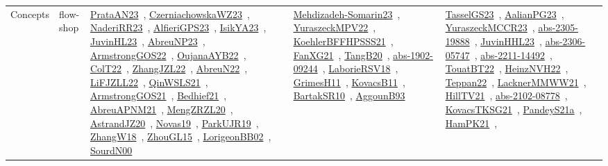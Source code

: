 {\begin{longtable}{lp{3cm}>{\raggedright\arraybackslash}p{6cm}>{\raggedright\arraybackslash}p{6cm}>{\raggedright\arraybackslash}p{8cm}}
Concepts & flow-shop & \href{works/PrataAN23.pdf}{PrataAN23}~\cite{PrataAN23}, \href{works/CzerniachowskaWZ23.pdf}{CzerniachowskaWZ23}~\cite{CzerniachowskaWZ23}, \href{works/NaderiRR23.pdf}{NaderiRR23}~\cite{NaderiRR23}, \href{works/AlfieriGPS23.pdf}{AlfieriGPS23}~\cite{AlfieriGPS23}, \href{works/IsikYA23.pdf}{IsikYA23}~\cite{IsikYA23}, \href{works/JuvinHL23.pdf}{JuvinHL23}~\cite{JuvinHL23}, \href{works/AbreuNP23.pdf}{AbreuNP23}~\cite{AbreuNP23}, \href{works/ArmstrongGOS22.pdf}{ArmstrongGOS22}~\cite{ArmstrongGOS22}, \href{works/OujanaAYB22.pdf}{OujanaAYB22}~\cite{OujanaAYB22}, \href{works/ColT22.pdf}{ColT22}~\cite{ColT22}, \href{works/ZhangJZL22.pdf}{ZhangJZL22}~\cite{ZhangJZL22}, \href{works/AbreuN22.pdf}{AbreuN22}~\cite{AbreuN22}, \href{works/LiFJZLL22.pdf}{LiFJZLL22}~\cite{LiFJZLL22}, \href{works/QinWSLS21.pdf}{QinWSLS21}~\cite{QinWSLS21}, \href{works/ArmstrongGOS21.pdf}{ArmstrongGOS21}~\cite{ArmstrongGOS21}, \href{works/Bedhief21.pdf}{Bedhief21}~\cite{Bedhief21}, \href{works/AbreuAPNM21.pdf}{AbreuAPNM21}~\cite{AbreuAPNM21}, \href{works/MengZRZL20.pdf}{MengZRZL20}~\cite{MengZRZL20}, \href{works/AstrandJZ20.pdf}{AstrandJZ20}~\cite{AstrandJZ20}, \href{works/Novas19.pdf}{Novas19}~\cite{Novas19}, \href{works/ParkUJR19.pdf}{ParkUJR19}~\cite{ParkUJR19}, \href{works/ZhangW18.pdf}{ZhangW18}~\cite{ZhangW18}, \href{works/ZhouGL15.pdf}{ZhouGL15}~\cite{ZhouGL15}, \href{works/LorigeonBB02.pdf}{LorigeonBB02}~\cite{LorigeonBB02}, \href{works/SourdN00.pdf}{SourdN00}~\cite{SourdN00} & \href{works/Mehdizadeh-Somarin23.pdf}{Mehdizadeh-Somarin23}~\cite{Mehdizadeh-Somarin23}, \href{works/YuraszeckMPV22.pdf}{YuraszeckMPV22}~\cite{YuraszeckMPV22}, \href{works/KoehlerBFFHPSSS21.pdf}{KoehlerBFFHPSSS21}~\cite{KoehlerBFFHPSSS21}, \href{works/FanXG21.pdf}{FanXG21}~\cite{FanXG21}, \href{works/TangB20.pdf}{TangB20}~\cite{TangB20}, \href{works/abs-1902-09244.pdf}{abs-1902-09244}~\cite{abs-1902-09244}, \href{works/LaborieRSV18.pdf}{LaborieRSV18}~\cite{LaborieRSV18}, \href{works/GrimesH11.pdf}{GrimesH11}~\cite{GrimesH11}, \href{works/KovacsB11.pdf}{KovacsB11}~\cite{KovacsB11}, \href{works/BartakSR10.pdf}{BartakSR10}~\cite{BartakSR10}, \href{works/AggounB93.pdf}{AggounB93}~\cite{AggounB93} & \href{works/TasselGS23.pdf}{TasselGS23}~\cite{TasselGS23}, \href{works/AalianPG23.pdf}{AalianPG23}~\cite{AalianPG23}, \href{works/YuraszeckMCCR23.pdf}{YuraszeckMCCR23}~\cite{YuraszeckMCCR23}, \href{works/abs-2305-19888.pdf}{abs-2305-19888}~\cite{abs-2305-19888}, \href{works/JuvinHHL23.pdf}{JuvinHHL23}~\cite{JuvinHHL23}, \href{works/abs-2306-05747.pdf}{abs-2306-05747}~\cite{abs-2306-05747}, \href{works/abs-2211-14492.pdf}{abs-2211-14492}~\cite{abs-2211-14492}, \href{works/TouatBT22.pdf}{TouatBT22}~\cite{TouatBT22}, \href{works/HeinzNVH22.pdf}{HeinzNVH22}~\cite{HeinzNVH22}, \href{works/Teppan22.pdf}{Teppan22}~\cite{Teppan22}, \href{works/LacknerMMWW21.pdf}{LacknerMMWW21}~\cite{LacknerMMWW21}, \href{works/HillTV21.pdf}{HillTV21}~\cite{HillTV21}, \href{works/abs-2102-08778.pdf}{abs-2102-08778}~\cite{abs-2102-08778}, \href{works/KovacsTKSG21.pdf}{KovacsTKSG21}~\cite{KovacsTKSG21}, \href{works/PandeyS21a.pdf}{PandeyS21a}~\cite{PandeyS21a}, \href{works/HamPK21.pdf}{HamPK21}~\cite{HamPK21}, 
\end{longtable}}
